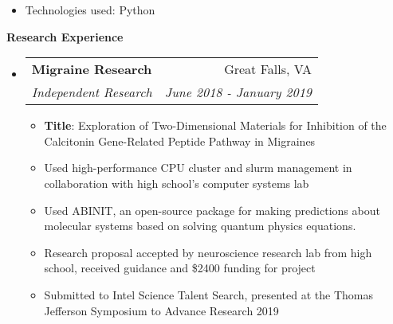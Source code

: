 \documentclass[letterpaper,11pt]{article}
\makeatletter
\newcommand{\resitem}[1]{\item #1 \vspace{-2pt}}
\newcommand{\resheading}[1]{{\large \colorbox{mygrey}{\begin{minipage}{\textwidth}{\textbf{#1 \vphantom{p\^{E}}}}\end{minipage}}}}
\newcommand{\ressubheading}[4]{
\begin{tabular*}{7.0in}{l@{\extracolsep{\fill}}r}
		\textbf{#1} & #2 \\
		\textit{#3} & \textit{#4} \\
\end{tabular*}\vspace{-6pt}}
\makeatother
\begin{document}
\begin{itemize}
\begin{itemize}
        \resitem{Technologies used: Python}
    \end{itemize}
\end{itemize}


\resheading{Research Experience}
\begin{itemize}
\item
	\ressubheading{Migraine Research}{Great Falls, VA}{Independent Research}{June 2018 - January 2019}
	\begin{itemize}
		\resitem{\textbf{Title}: Exploration of Two-Dimensional Materials for Inhibition of the 
	Calcitonin Gene-Related Peptide Pathway in Migraines}
	    \resitem{Used high-performance CPU cluster and slurm management in collaboration with high school's computer systems lab}
	    \resitem{Used ABINIT, an open-source package for making predictions about molecular systems based on solving quantum physics equations.}
	    \resitem{Research proposal accepted by neuroscience research lab from high school, received guidance and \$2400 funding for project}
	    \resitem{Submitted to Intel Science Talent Search, presented at the Thomas Jefferson Symposium to Advance Research 2019}

\end{itemize}
\end{itemize}
\end{document}
